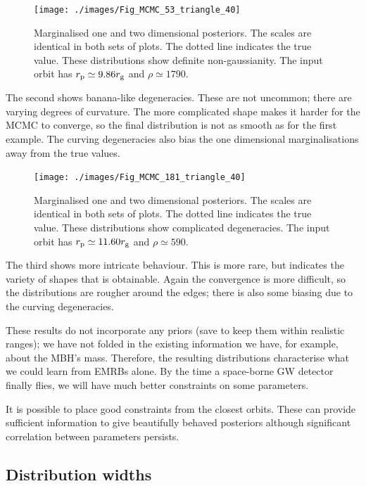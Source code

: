 \begin{figure}[!htp]
\begin{center}
   \texttt{[image: ./images/Fig\_MCMC\_53\_triangle\_40]}
\caption{Marginalised one and two dimensional posteriors. The scales are identical in both sets of plots. The dotted line indicates the true value. These distributions show definite non-gaussianity. The input orbit has $r_\mathrm{p} \simeq 9.86 r_\mathrm{g}$ and $\rho \simeq 1790$.\label{fig:MCMC-2}}
\end{center}
\end{figure}

The second shows banana-like degeneracies. These are not uncommon; there are varying degrees of curvature. The more complicated shape makes it harder for the MCMC to converge, so the final distribution is not as smooth as for the first example. The curving degeneracies also bias the one dimensional marginalisations away from the true values.

\begin{figure}[!htp]
\begin{center}
   \texttt{[image: ./images/Fig\_MCMC\_181\_triangle\_40]}
\caption{Marginalised one and two dimensional posteriors. The scales are identical in both sets of plots. The dotted line indicates the true value. These distributions show complicated degeneracies. The input orbit has $r_\mathrm{p} \simeq 11.60 r_\mathrm{g}$ and $\rho \simeq 590$.}
\label{fig:MCMC-3}
\end{center}
\end{figure}

The third shows more intricate behaviour. This is more rare, but indicates the variety of shapes that is obtainable. Again the convergence is more difficult, so the distributions are rougher around the edges; there is also some biasing due to the curving degeneracies.

These results do not incorporate any priors (save to keep them within realistic ranges); we have not folded in the existing information we have, for example, about the MBH's mass. Therefore, the resulting distributions characterise what we could learn from EMRBs alone. By the time a space-borne GW detector finally flies, we will have much better constraints on some parameters.

It is possible to place good constraints from the closest orbits. These can provide sufficient information to give beautifully behaved posteriors although significant correlation between parameters persists.

\subsection{Distribution widths}

